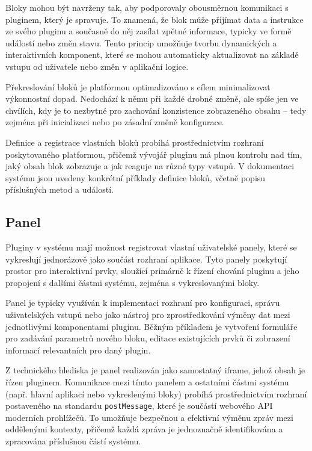 Bloky mohou být navrženy tak, aby podporovaly obousměrnou komunikaci s pluginem, který je spravuje. 
To znamená, že blok může přijímat data a instrukce ze svého pluginu a současně do něj zasílat zpětné informace, typicky ve formě událostí nebo změn stavu. 
Tento princip umožňuje tvorbu dynamických a interaktivních komponent, které se mohou automaticky aktualizovat na základě vstupu od uživatele nebo změn v aplikační logice.

Překreslování bloků je platformou optimalizováno s cílem minimalizovat výkonnostní dopad. 
Nedochází k němu při každé drobné změně, ale spíše jen ve chvílích, kdy je to nezbytné pro zachování konzistence zobrazeného obsahu -- tedy zejména při inicializaci nebo po zásadní změně konfigurace.

Definice a registrace vlastních bloků probíhá prostřednictvím rozhraní poskytovaného platformou, přičemž vývojář pluginu má plnou kontrolu nad tím, jaký obsah blok zobrazuje a jak reaguje na různé typy vstupů. 
V dokumentaci systému jsou uvedeny konkrétní příklady definice bloků, včetně popisu příslušných metod a událostí.


\subsection{Panel}

Pluginy v systému mají možnost registrovat vlastní uživatelské panely, které se vykreslují jednorázově jako součást rozhraní aplikace. 
Tyto panely poskytují prostor pro interaktivní prvky, sloužící primárně k řízení chování pluginu a jeho propojení s dalšími částmi systému, zejména s vykreslovanými bloky.

Panel je typicky využíván k implementaci rozhraní pro konfiguraci, správu uživatelských vstupů nebo jako nástroj pro zprostředkování výměny dat mezi jednotlivými komponentami pluginu. 
Běžným příkladem je vytvoření formuláře pro zadávání parametrů nového bloku, editace existujících prvků či zobrazení informací relevantních pro daný plugin.

Z technického hlediska je panel realizován jako samostatný iframe, jehož obsah je řízen pluginem. 
Komunikace mezi tímto panelem a ostatními částmi systému (např. hlavní aplikací nebo vykreslenými bloky) probíhá prostřednictvím rozhraní postaveného na standardu \texttt{postMessage}, které je součástí webového API moderních prohlížečů. 
To umožňuje bezpečnou a efektivní výměnu zpráv mezi oddělenými kontexty, přičemž každá zpráva je jednoznačně identifikována a zpracována příslušnou částí systému.

